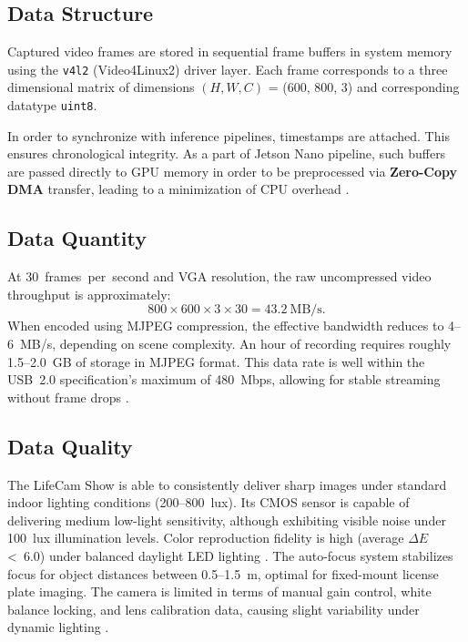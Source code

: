 \subsection{Data Structure}
Captured video frames are stored in sequential frame buffers in system memory using the \texttt{v4l2} (Video4Linux2) driver layer.  
Each frame corresponds to a three dimensional matrix of dimensions $(H, W, C)$ = (600, 800, 3) and corresponding datatype \texttt{uint8}.  

In order to synchronize with inference pipelines, timestamps are attached. This ensures chronological integrity. 
As a part of Jetson Nano pipeline, such buffers are passed directly to GPU memory in order to be preprocessed via \textbf{Zero-Copy DMA} transfer, leading to a minimization of CPU overhead \cite{jetson_nano_doc}.  

\subsection{Data Quantity}
At 30~frames~per~second and VGA resolution, the raw uncompressed video throughput is approximately:
\[
800 \times 600 \times 3 \times 30 = 43.2~\text{MB/s}.
\]
When encoded using MJPEG compression, the effective bandwidth reduces to 4–6~MB/s, depending on scene complexity.  
An hour of recording requires roughly 1.5–2.0~GB of storage in MJPEG format.  
This data rate is well within the \ac{USB}~2.0 specification’s maximum of 480~Mbps, allowing for stable streaming without frame drops \cite{linux_uvc_driver}.  

\subsection{Data Quality}
The LifeCam Show is able to consistently deliver sharp images under standard indoor lighting conditions (200–800~lux).  
Its \ac{CMOS} sensor is capable of delivering medium low-light sensitivity, although exhibiting visible noise under 100~lux illumination levels.  
Color reproduction fidelity is high (average $\Delta E$ <~6.0) under balanced daylight LED lighting \cite{techradar_lifecam_rev	iew}.  
The auto-focus system stabilizes focus for object distances between 0.5–1.5~m, optimal for fixed-mount license plate imaging.
The camera is limited in terms of manual gain control, white balance locking, and lens calibration data, causing slight variability under dynamic lighting \cite{microsoft_lifecam_datasheet}.

